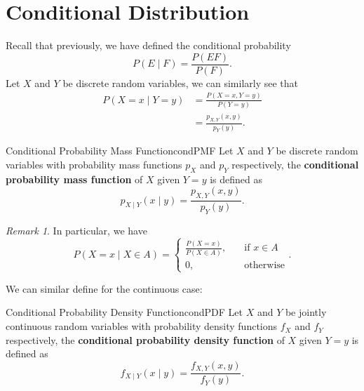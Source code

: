 \documentclass[math]{amznotes}
\theoremstyle{remark}
\newtheorem*{remark}{Remark}
\begin{document}
\section{Conditional Distribution}
Recall that previously, we have defined the conditional probability
\begin{equation*}
    P(E \mid F) = \frac{P(EF)}{P(F)}.
\end{equation*}
Let $X$ and $Y$ be discrete random variables, we can similarly see that
\begin{align*}
    P(X = x \mid Y = y) & = \frac{P(X = x, Y = y)}{P(Y = y)} \\
    & = \frac{p_{X, Y}(x, y)}{p_Y(y)}.
\end{align*}
\begin{dfnbox}{Conditional Probability Mass Function}{condPMF}
    Let $X$ and $Y$ be discrete random variables with probability mass functions $p_X$ and $p_Y$ respectively, the {\color{red} \textbf{conditional probability mass function}} of $X$ given $Y = y$ is defined as
    \begin{equation*}
        p_{X \mid Y}(x \mid y) = \frac{p_{X, Y}(x, y)}{p_Y(y)}.
    \end{equation*}
\end{dfnbox}
\begin{notebox}
    \begin{remark}
        In particular, we have
        \begin{equation*}
            P(X = x \mid X \in A) = \begin{cases}
                \frac{P(X = x)}{P(X \in A)}, & \quad\textrm{if } x \in A \\
                0, & \quad\textrm{otherwise}
            \end{cases}.
        \end{equation*}
    \end{remark}
\end{notebox}
We can similar define for the continuous case:
\begin{dfnbox}{Conditional Probability Density Function}{condPDF}
    Let $X$ and $Y$ be jointly continuous random variables with probability density functions $f_X$ and $f_Y$ respectively, the {\color{red} \textbf{conditional probability density function}} of $X$ given $Y = y$ is defined as
    \begin{equation*}
        f_{X \mid Y}(x \mid y) = \frac{f_{X, Y}(x, y)}{f_Y(y)}.
    \end{equation*}
\end{dfnbox}
\end{document}

